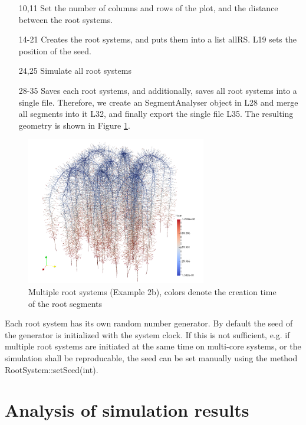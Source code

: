 \documentclass[a4paper]{article}
\begin{document}
\begin{itemize}

\item[10,11] Set the number of columns and rows of the plot, and the distance between the root systems.

\item[14-21] Creates the root systems, and puts them into a list allRS. L19 sets the position of the seed. 

\item[24,25] Simulate all root systems 

\item[28-35] Saves each root systems, and additionally, saves all root systems into a single file. 
Therefore, we create an SegmentAnalyser object in L28 and merge all segments into it L32, and finally export the single file L35. The resulting geometry is shown in Figure \ref{fig:multiple}.

\end{itemize}

\begin{figure}
\centering
\includegraphics[width=0.7\textwidth]{example_2b.png}
\caption{Multiple root systems (Example 2b), colors denote the creation time of the root segments} \label{fig:multiple}
\end{figure}

Each root system has its own random number generator. By default the seed of the generator is initialized with the system clock. 
If this is not sufficient, e.g. if multiple root systems are initiated at the same time on multi-core systems, or the simulation shall be reproducable, the seed can be set manually using the method RootSystem::setSeed(int).




\section{Analysis of simulation results}
\end{document}
